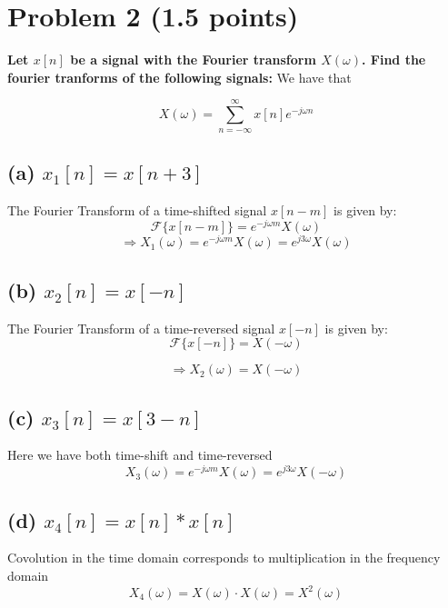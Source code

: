 \section{Problem 2 (1.5 points)}
\textbf{Let $x[n]$ be a signal with the Fourier transform $X(\omega)$. Find the fourier tranforms of the following signals:}
We have that

\begin{equation*}
    X(\omega)=\sum_{n=-\infty}^\infty x[n]e^{-j\omega n}
\end{equation*}

\subsection*{(a) $ x_{1}[n]=x[n+3] $}
The Fourier Transform of a time-shifted signal $x[n-m]$ is given by:
\begin{equation*}
    \mathcal{F}\{x[n-m]\}=e^{-j \omega m} X(\omega)
\end{equation*}
\begin{equation*}
    \Rightarrow X_1(\omega)=e^{-j\omega m}X(\omega)=e^{j3\omega}X(\omega)
\end{equation*}

\subsection*{(b) $ x_{2}[n]=x[-n] $}
The Fourier Transform of a time-reversed signal $x[-n]$ is given by:
\begin{equation*}
    \mathcal{F}\{x[-n]\}=X(-\omega) 
\end{equation*}

\begin{equation*}
    \Rightarrow X_2(\omega)=X(-\omega) 
\end{equation*}

\subsection*{(c) $ x_{3}[n]=x[3-n] $}
Here we have both time-shift and time-reversed
\begin{equation*}
    X_3(\omega)=e^{-j\omega m}X(\omega)=e^{j3\omega}X(-\omega)
\end{equation*}
\subsection*{(d) $ x_{4}[n]=x[n] * x[n] $}
Covolution in the time domain corresponds to multiplication in the frequency domain
\begin{equation*}
    X_4(\omega)=X(\omega)\cdot X(\omega)=X^2(\omega)
\end{equation*}
